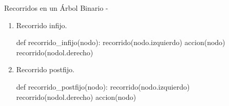 \documentclass[10pt,envcountsect,spanish]{beamer}
\begin{document}
\begin{frame}{Recorridos en un Árbol Binario - }
\begin{itemize}
\begin{enumerate}
\item Recorrido infijo.

\hfil\begin{minipage}{.6\textwidth}
\begin{pyverbatim}[][frame=single, fontsize=\footnotesize]
def recorrido_infijo(nodo):
    recorrido(nodo.izquierdo)
    accion(nodo)
    recorrido(nodol.derecho)
\end{pyverbatim}
\end{minipage}

\item Recorrido postfijo.

\hfil\begin{minipage}{.6\textwidth}
\begin{pyverbatim}[][frame=single, fontsize=\footnotesize]
def recorrido_postfijo(nodo):
    recorrido(nodo.izquierdo)
    recorrido(nodol.derecho)
    accion(nodo)
\end{pyverbatim}
\end{minipage}

\end{enumerate}

\end{itemize}

\end{frame}
\end{document}
